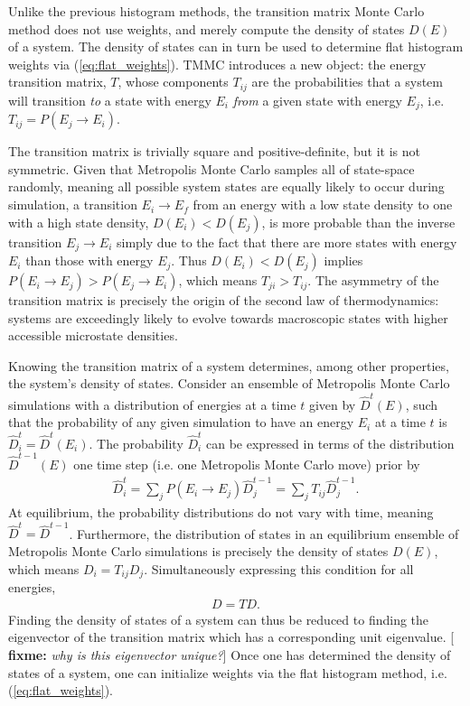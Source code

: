 \documentclass[11pt]{article}
\newcommand{\p}[1]{\left(#1\right)} %
\newcommand{\red}[1]{{\bf \color{red} #1}}
\newcommand{\fixme}[1]{[\red{fixme:} \emph{#1}]}
\begin{document}
Unlike the previous histogram methods, the transition matrix Monte
Carlo method does not use weights, and merely compute the density of
states $D\p{E}$ of a system\cite{tmmc}. The density of states can in
turn be used to determine flat histogram weights via
(\ref{eq:flat_weights}). TMMC introduces a new object: the energy
transition matrix, $T$, whose components $T_{ij}$ are the
probabilities that a system will transition {\it to} a state with
energy $E_i$ {\it from} a given state with energy $E_j$,
i.e. $T_{ij}=P\p{E_j\to E_i}$.

The transition matrix is trivially square and positive-definite, but
it is not symmetric. Given that Metropolis Monte Carlo samples all of
state-space randomly, meaning all possible system states are equally
likely to occur during simulation, a transition $E_i\to E_f$ from an
energy with a low state density to one with a high state density,
$D\p{E_i}<D\p{E_j}$, is more probable than the inverse transition
$E_j\to E_i$ simply due to the fact that there are more states with
energy $E_i$ than those with energy $E_j$. Thus $D\p{E_i}<D\p{E_j}$
implies $P\p{E_i\to E_j}>P\p{E_j\to E_i}$, which means
$T_{ji}>T_{ij}$. The asymmetry of the transition matrix is precisely
the origin of the second law of thermodynamics: systems are
exceedingly likely to evolve towards macroscopic states with higher
accessible microstate densities.

Knowing the transition matrix of a system determines, among other
properties, the system's density of states. Consider an ensemble of
Metropolis Monte Carlo simulations with a distribution of energies at
a time $t$ given by $\hat D^{t}\p{E}$, such that the probability of
any given simulation to have an energy $E_i$ at a time $t$ is $\hat
D_i^{t}=\hat D^{t}\p{E_i}$. The probability $\hat D_i^{t}$ can be
expressed in terms of the distribution $\hat D^{t-1}\p{E}$ one time
step (i.e. one Metropolis Monte Carlo move) prior by
\begin{align}
  \hat D_i^{t}=\sum_jP\p{E_i\to E_j}\hat D_j^{t-1} =\sum_j T_{ij}\hat
  D_j^{t-1}.
  \label{eq:transition_evolution}
\end{align}
At equilibrium, the probability distributions do not vary with time,
meaning $\hat D^{t}=\hat D^{t-1}$. Furthermore, the distribution of
states in an equilibrium ensemble of Metropolis Monte Carlo
simulations is precisely the density of states $D\p{E}$, which means
$D_i=T_{ij}D_j$.  Simultaneously expressing this condition for all
energies,
\begin{align}
  D=TD. \label{eq:dos_eigen}
\end{align}
Finding the density of states of a system can thus be reduced to
finding the eigenvector of the transition matrix which has a
corresponding unit eigenvalue. \fixme{why is this eigenvector unique?}
Once one has determined the density of states of a system, one can
initialize weights via the flat histogram method,
i.e. (\ref{eq:flat_weights}).
\end{document}

